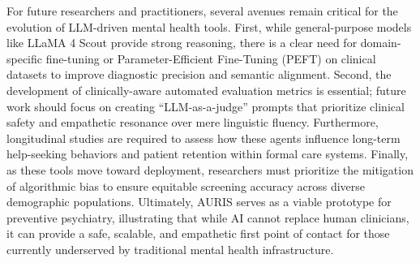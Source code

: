 ﻿\documentclass[acmsmall,screen]{acmart}
\begin{document}
For future researchers and practitioners, several avenues remain critical for the evolution of LLM-driven mental health tools. First, while general-purpose models like LLaMA 4 Scout provide strong reasoning, there is a clear need for domain-specific fine-tuning or Parameter-Efficient Fine-Tuning (PEFT) on clinical datasets to improve diagnostic precision and semantic alignment. Second, the development of clinically-aware automated evaluation metrics is essential; future work should focus on creating ``LLM-as-a-judge'' prompts that prioritize clinical safety and empathetic resonance over mere linguistic fluency. Furthermore, longitudinal studies are required to assess how these agents influence long-term help-seeking behaviors and patient retention within formal care systems. Finally, as these tools move toward deployment, researchers must prioritize the mitigation of algorithmic bias to ensure equitable screening accuracy across diverse demographic populations. Ultimately, AURIS serves as a viable prototype for preventive psychiatry, illustrating that while AI cannot replace human clinicians, it can provide a safe, scalable, and empathetic first point of contact for those currently underserved by traditional mental health infrastructure.
\end{document}
